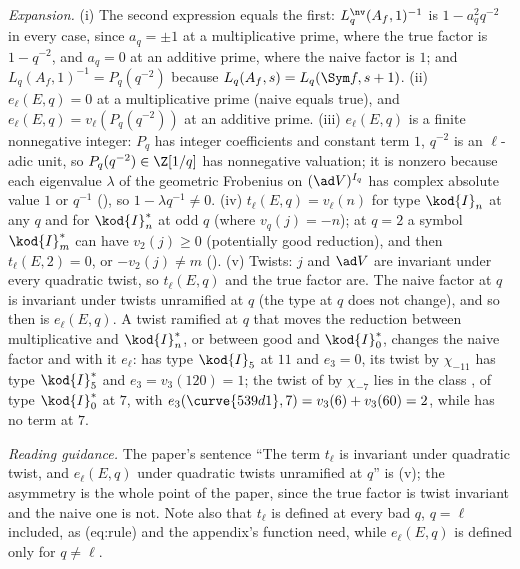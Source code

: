 \begin{sloppypar}
\emph{Expansion.} (i) The second expression equals the first: $L^{\nv}_q(A_f,1)^{-1}$ is $1-a_q^2q^{-2}$ in every case, since $a_q=\pm1$ at a multiplicative prime, where
the true factor is $1-q^{-2}$, and $a_q=0$ at an additive prime, where the naive factor is $1$; and $L_q(A_f,1)^{-1}=P_q(q^{-2})$ because $L_q(A_f,s)=L_q(\Sym f,s+1)$.
(ii) $e_\ell(E,q)=0$ at a multiplicative prime (naive equals true), and $e_\ell(E,q)=v_\ell(P_q(q^{-2}))$ at an additive prime. (iii) $e_\ell(E,q)$ is a finite
nonnegative integer: $P_q$ has integer coefficients and constant term $1$, $q^{-2}$ is an $\ell$-adic unit, so $P_q(q^{-2})\in\Z[1/q]$ has nonnegative valuation; it is
nonzero because each eigenvalue $\lambda$ of the geometric Frobenius on $(\ad V)^{I_q}$ has complex absolute value $1$ or $q^{-1}$ (), so $1-\lambda q^{-1}\ne0$. (iv)
$t_\ell(E,q)=v_\ell(n)$ for type $\kod{I}_n$ at any $q$ and for $\kod{I}_n^*$ at odd $q$ (where $v_q(j)=-n$); at $q=2$ a symbol $\kod{I}_m^*$ can have $v_2(j)\ge0$ (potentially good
reduction), and then $t_\ell(E,2)=0$, or $-v_2(j)\ne m$ (). (v) Twists: $j$ and $\ad V$ are invariant under every quadratic twist, so $t_\ell(E,q)$
and the true factor are. The naive factor at $q$ is invariant under twists unramified at $q$ (the type at $q$ does not change), and so then is $e_\ell(E,q)$. A twist
ramified at $q$ that moves the reduction between multiplicative and $\kod{I}_n^*$, or between good and $\kod{I}_0^*$, changes the naive factor and with it $e_\ell$:
 has type $\kod{I}_5$ at $11$ and $e_3=0$, its twist  by $\chi_{-11}$ has type $\kod{I}_5^*$ and $e_3=v_3(120)=1$; the twist  of  by
$\chi_{-7}$ lies in the class , of type $\kod{I}_0^*$ at $7$, with $e_3(\curve{539d1},7)=v_3(6)+v_3(60)=2$, while  has no term at $7$.

\emph{Reading guidance.} The paper's sentence ``The term $t_\ell$ is invariant under quadratic twist, and $e_\ell(E,q)$ under quadratic twists unramified at $q$'' is
(v); the asymmetry is the whole point of the paper, since the true factor is twist invariant and the naive one is not. Note also that $t_\ell$ is defined at every bad
$q$, $q=\ell$ included, as (eq:rule) and the appendix's function need, while $e_\ell(E,q)$ is defined only for $q\ne\ell$.


\end{sloppypar}
